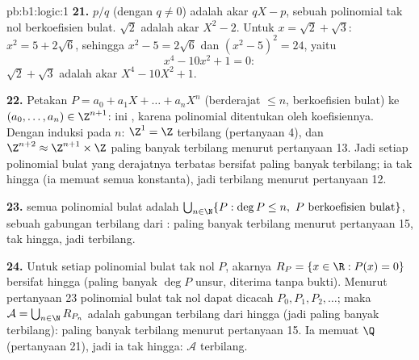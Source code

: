 \begin{solution}{pb:b1:logic:1}
\textbf{21.} $p/q$ (dengan $q \neq 0$) adalah akar $qX - p$, sebuah
polinomial tak nol berkoefisien bulat. $\sqrt 2$ adalah akar
$X^2 - 2$. Untuk $x = \sqrt 2 + \sqrt 3$: $x^2 = 5 + 2\sqrt 6$, sehingga
$x^2 - 5 = 2\sqrt 6$ dan $(x^2 - 5)^2 = 24$, yaitu
\[
x^4 - 10x^2 + 1 = 0 :
\]
$\sqrt 2 + \sqrt 3$ adalah akar $X^4 - 10X^2 + 1$.

\textbf{22.} Petakan $P = a_0 + a_1X + \dots + a_nX^n$ (berderajat $\leq n$,
berkoefisien bulat) ke $(a_0, \dots, a_n) \in \Z^{n+1}$:  ini
, karena polinomial ditentukan oleh koefisiennya. Dengan
induksi pada $n$: $\Z^1 = \Z$ terbilang (pertanyaan 4), dan
$\Z^{n+2} \approx \Z^{n+1} \times \Z$ paling banyak terbilang menurut
pertanyaan 13. Jadi setiap  polinomial bulat yang derajatnya terbatas
bersifat paling banyak terbilang; ia tak hingga (ia memuat semua konstanta), jadi
terbilang menurut pertanyaan 12.

\textbf{23.}  semua polinomial bulat adalah $\bigcup_{n \in
\N} \{P : \deg P \leq n,\ P \text{ berkoefisien bulat}\}$, sebuah
gabungan terbilang dari : paling banyak terbilang menurut
pertanyaan 15, tak hingga, jadi terbilang.

\textbf{24.} Untuk setiap polinomial bulat tak nol $P$,  akarnya
$R_P = \{x \in \R : P(x) = 0\}$ bersifat hingga (paling banyak $\deg P$
unsur, diterima tanpa bukti). Menurut pertanyaan 23 polinomial bulat tak nol
dapat dicacah $P_0, P_1, P_2, \dots$; maka $\mathcal{A} =
\bigcup_{n \in \N} R_{P_n}$ adalah gabungan terbilang dari  hingga (jadi
paling banyak terbilang): paling banyak terbilang menurut pertanyaan 15. Ia
memuat $\Q$ (pertanyaan 21), jadi ia tak hingga: $\mathcal{A}$
terbilang.


\end{solution}
